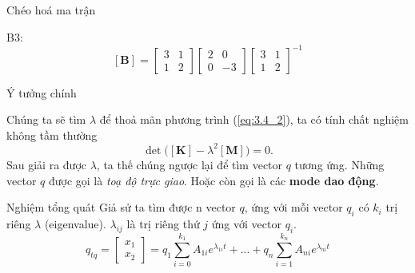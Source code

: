 \begin{frame}{Chéo hoá ma trận}
\begin{center}
\begin{minipage}{0.45\linewidth}
            B3: \[\mathbf{[B]} = \left[
                \begin{array}{cc}
                    3 & 1 \\
                    1 & 2
                \end{array}
                \right]                 
                \left[
                \begin{array}{cc}
                    2 & 0 \\
                    0 & -3
                \end{array}
                \right]                
                \left[
                \begin{array}{cc}
                    3 & 1 \\
                    1 & 2
                \end{array}
                \right]^{-1}
                \]
        \end{minipage}
    \end{center}
\end{frame}
\begin{frame}{Ý tưởng chính}

    Chúng ta sẽ tìm \(\lambda\) để thoả mãn phương trình (\ref{eq:3.4_2}), ta có tính chất nghiệm không tầm thường
    \begin{equation}
        \det{\Big( \mathbf{[K]} - \lambda^2 \mathbf{[M]}\Big)} = 0.
        \label{eq:3.4_7}
    \end{equation}
    Sau giải ra được \(\lambda\), ta thế chúng ngược lại để tìm vector \(q\) tương ứng. Những vector \(q\) được gọi là \textit{toạ độ trực giao}. Hoặc còn gọi là các \textbf{mode dao động}.
\end{frame}

\begin{frame}{Nghiệm tổng quát}
    Giả sử ta tìm được n vector \(q\), ứng với mỗi vector \(q_i\) có \(k_i\) trị riêng \(\lambda\) (eigenvalue). \(\lambda_{ij}\) là trị riêng thứ \(j\) ứng với vector \(q_i\).
    \begin{equation}
    q_{tq} = 
    \left[\begin{array}{c}
    x_1 \\ x_2
    \end{array}\right] \displaystyle = q_1 \sum_{i=0}^{k_1} A_{1i} e^{\lambda_{1i} t} + ... +  q_n \sum_{i=1}^{k_n} A_{ni} e^{\lambda_{ni} t}
    \label{eq:3.4_8}
    \end{equation}
\end{frame}